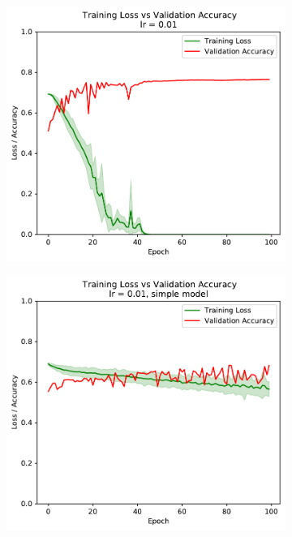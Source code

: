 \documentclass[sigconf,nonacm]{acmart}
\begin{document}
\begin{figure}[ht]
\begin{subfigure}[c]{0.3\columnwidth}
\includegraphics[width=\textwidth]{plot_0_01.pdf}
\end{subfigure}
\begin{subfigure}[c]{0.3\columnwidth}
\includegraphics[width=\textwidth]{plot_simple_0_01.pdf}

\end{subfigure}
\end{figure}
\end{document}
